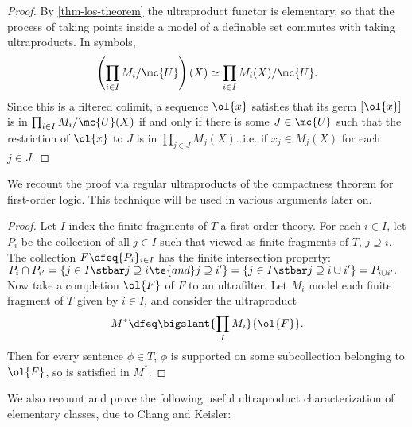 
\begin{proof}
By \ref{thm-los-theorem} the ultraproduct functor is elementary, so that the process of taking points inside a model of a definable set commutes with taking ultraproducts. In symbols, $$\left(\prod_{i \in I} M_i / \mc{U}\right)(X) \simeq \prod_{i \in I} M_i(X) / \mc{U}.$$ Since this is a filtered colimit, a sequence $\ol{x}$ satisfies that its germ $[\ol{x}]$ is in $\prod_{i \in I} M_i / \mc{U}(X)$ if and only if there is some $J \in \mc{U}$ such that the restriction of $\ol{x}$ to $J$ is in $\prod_{j \in J} M_j(X)$. i.e. if $x_j \in M_j(X)$ for each $j \in J$.
  \end{proof}

We recount the proof via regular ultraproducts of the compactness theorem for first-order logic. This technique will be used in various arguments later on.
  
  \begin{proof}
Let $I$ index the finite fragments of $T$ a first-order theory. For each $i \in I$, let $P_i$ be the collection of all $j \in I$ such that viewed as finite fragments of $T$, $j \supseteq i$. The collection $F \dfeq \{P_i\}_{i \in I}$ has the finite intersection property: $P_i \cap P_{i'} = \{j \in I \stbar j \supseteq i \te{ and } j \supseteq i'\} = \{j \in I \stbar j \supseteq i \cup i'\} = P_{i \cup i'}.$  Now take a completion $\ol{F}$ of $F$ to an ultrafilter. Let $M_i$ model each finite fragment of $T$ given by $i \in I$, and consider the ultraproduct $$M^* \dfeq \displaystyle \bigslant{\prod_{I} M_i}{\ol{F}}.$$ Then for every sentence $\phi \in T$, $\phi$ is supported on some subcollection belonging to $\ol{F}$, so is satisfied in $M^*$.
\end{proof}

We also recount and prove the following useful ultraproduct characterization of elementary classes, due to Chang and Keisler:


